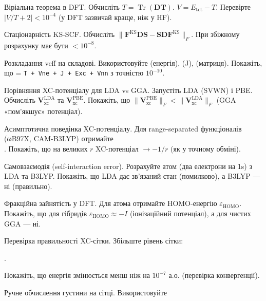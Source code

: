 \begin{tasks}
\item Віріальна теорема в DFT.
Обчисліть $T = \operatorname{Tr}(\mathbf{D}\mathbf{T})$.
$V = E_{\text{tot}} - T$.
Перевірте $|V/T + 2| < 10^{-4}$ (у DFT зазвичай краще, ніж у HF).

\item Стаціонарність KS-SCF.
Обчисліть $\|\mathbf{F}^{\text{KS}} \mathbf{D} \mathbf{S} - \mathbf{S} \mathbf{D} \mathbf{F}^{\text{KS}}\|_F$.
При збіжному розрахунку має бути $< 10^{-8}$.

\item Розкладання veff на складові.
Використовуйте  (енергія),  (J),  (матриця).
Покажіть, що  = \texttt{T + Vne + J + Exc + Vnn} з точністю $10^{-10}$.

\item Порівняння XC-потенціалу для LDA vs GGA.
Запустіть LDA (SVWN) і PBE.
Обчисліть $\mathbf{V}_{\text{xc}}^{\text{LDA}}$ та $\mathbf{V}_{\text{xc}}^{\text{PBE}}$.
Покажіть, що $\|\mathbf{V}_{\text{xc}}^{\text{PBE}}\|_F < \|\mathbf{V}_{\text{xc}}^{\text{LDA}}\|_F$ (GGA «пом’якшує» потенціал).

\item Асимптотична поведінка XC-потенціалу.
Для range-separated функціоналів (ωB97X, CAM-B3LYP) отримайте\\ .
Покажіть, що на великих $r$ XC-потенціал $\to -1/r$ (як у точному обміні).

\item Самовзаємодія (self-interaction error).
Розрахуйте атом  (два електрони на 1s) з LDA та B3LYP.
Покажіть, що LDA дає зв’язаний стан (помилково), а B3LYP --- ні (правильно).

\item Фракційна зайнятість у DFT.
Для атома  отримайте HOMO-енергію $\varepsilon_{\text{HOMO}}$.
Покажіть, що для гібридів $\varepsilon_{\text{HOMO}} \approx -I$ (іонізаційний потенціал), а для чистих GGA --- ні.

\item Перевірка правильності XC-сітки.
Збільште рівень сітки:

.

Покажіть, що енергія змінюється менш ніж на $10^{-7}$ а.о. (перевірка конвергенції).

\item Ручне обчислення густини на сітці.
Використовуйте


\end{tasks}
